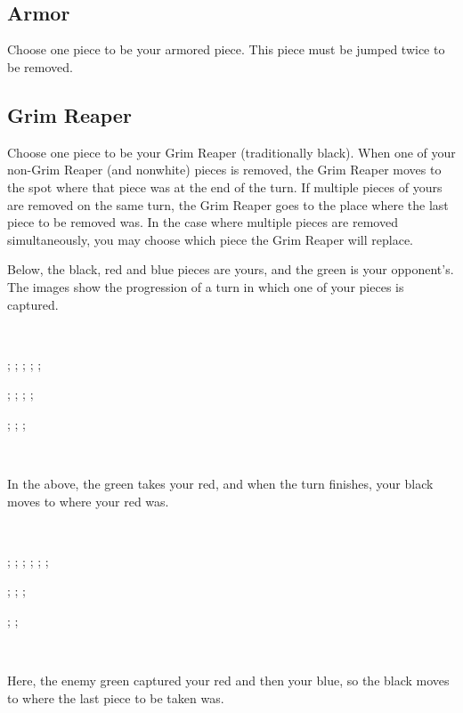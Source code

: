 \documentclass{article}
\begin{document}
\

\

\subsection*{Armor}

Choose one piece to be your armored piece.
This piece must be jumped twice to be removed.

\newpage

\subsection*{Grim Reaper}

Choose one piece to be your Grim Reaper (traditionally black).
When one of your non-Grim Reaper (and nonwhite) pieces is removed,
the Grim Reaper moves to the spot where that piece was at the end of the turn. If multiple pieces of yours are removed on the same turn, the Grim Reaper goes to the place where the last piece to be removed was.
In the case where multiple pieces are removed simultaneously,
you may choose which piece the Grim Reaper will replace.

Below, the black, red and blue pieces are yours,
and the green is your opponent's.
The images show the progression of a turn in which one of your pieces is captured.

\

\begin{center}
  \begin{struggleboard}
    ;
    ;
    ;
    ;
    ;
  \end{struggleboard}
  \begin{struggleboard}
    ;
    ;
    ;
    ;
  \end{struggleboard}
  \begin{struggleboard}
    ;
    ;
    ;
  \end{struggleboard}
\end{center}

\

In the above, the green takes your red, and when the turn finishes,
your black moves to where your red was.

\

\begin{center}
  \begin{struggleboard}
    ;
    ;
    ;
    ;
    ;
    ;
  \end{struggleboard}
  \begin{struggleboard}
    ;
    ;
    ;
  \end{struggleboard}
  \begin{struggleboard}
    ;
    ;
  \end{struggleboard}
\end{center}

\

Here, the enemy green captured your red and then your blue,
so the black moves to where the last piece to be taken was.
\end{document}
